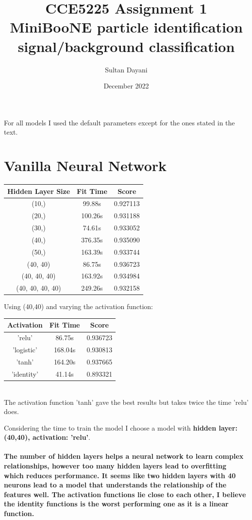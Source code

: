 \documentclass{article}
\title{CCE5225 \dashv{} Assignment 1 \\
\large MiniBooNE particle identification \\ signal/background classification}
\author{Sultan Dayani}
\date{December 2022}
\begin{document}
For all models I used the default parameters except for the ones stated in the text.
\section{Vanilla Neural Network}
\begin{tabular}{|c| c c|}
\hline
Hidden Layer Size & Fit Time & Score \\ [0.5ex] 
\hline
(10,) & 99.88s & 0.927113   \\
(20,) & 100.26s & 0.931188   \\
(30,) & 74.61s & 0.933052   \\
\rowcolor{LightYellow}
(40,) & 376.35s & 0.935090   \\
(50,) & 163.39s & 0.933744   \\ 
\hline
\hline
\rowcolor{LightYellow}
(40, 40) & 86.75s & 0.936723 \\
(40, 40, 40) & 163.92s & 0.934984 \\
(40, 40, 40, 40) & 249.26s & 0.932158 \\
\hline
\end{tabular}

Using (40,40) and varying the activation function: \\
\begin{tabular}{|c| c c|}
	\hline  
	Activation & Fit Time & Score \\ [0.5ex] 
	\hline
	\rowcolor{LightYellow}
  'relu' & 86.75s & 0.936723 \\ 
  'logistic' & 168.04s & 0.930813 \\ 
  'tanh' & 164.20s & 0.937665 \\ 
  'identity' & 41.14s & 0.893321 \\ 
	\hline
\end{tabular} \\
The activation function 'tanh' gave the best results but takes twice the time 'relu' does.

Considering the time to train the model I choose a model with \textbf{hidden layer: (40,40), activation: 'relu'}.

\paragraph[Comment]{
The number of hidden layers helps a neural network to learn complex relationships, however too many hidden layers lead to overfitting which reduces performance.
It seems like two hidden layers with 40 neurons lead to a model that understands the relationship of the features well.
The activation functions lie close to each other, I believe the identity functions is the worst performing one as it is a linear function.
}
\end{document}
